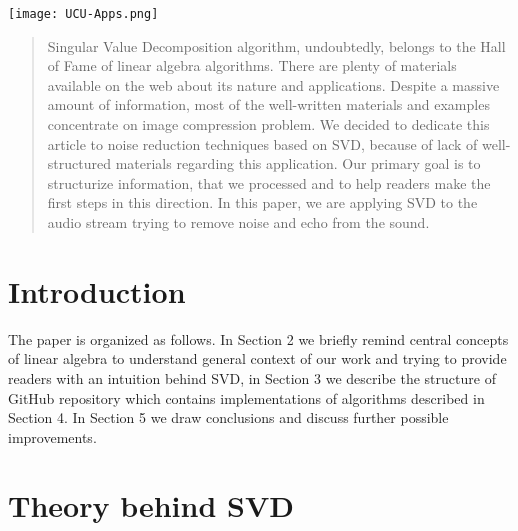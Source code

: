 \begin{titlepage}

\texttt{[image: UCU-Apps.png]}\\[1cm] %
 

\vfill %

\end{titlepage}

\cleardoublepage
{}
\tableofcontents
\cleardoublepage
{}

\begin{abstract}
Singular Value Decomposition algorithm, undoubtedly, belongs to the Hall of Fame of linear algebra algorithms. There are plenty of materials available on the web about its nature and applications. Despite a massive amount of information, most of the well-written materials and examples concentrate on image compression problem. We decided to dedicate this article to noise reduction techniques based on SVD, because of lack of well-structured materials regarding this application. Our primary goal is to structurize information, that we processed and to help readers make the first steps in this direction. In this paper, we are applying SVD to the audio stream trying to remove noise and echo from the sound.
\end{abstract}

\section{Introduction}

The paper is organized as follows. In Section 2 we briefly remind central concepts of linear algebra to understand general context of our work and trying to provide readers with an intuition behind SVD, in Section 3 we describe the structure of GitHub repository which contains implementations of algorithms described in Section 4. In Section 5 we draw conclusions and discuss further possible improvements.

\section{Theory behind SVD}


